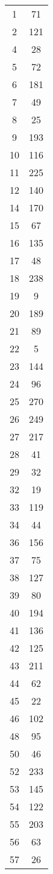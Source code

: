 \documentclass[10pt,letterpaper]{article}\usepackage[]{graphicx}\usepackage[]{color}
\begin{document}
\begin{center}
\begin{longtable}[c]{cc}
		1  & 71 \\
		2  & 121 \\
		4  & 28 \\
		5  & 72 \\
		6  & 181 \\
		7  & 49 \\
		8  & 25 \\
		9  & 193 \\
		10 & 116 \\
		11 & 225 \\
		12 & 140 \\
		14 & 170 \\
		15 & 67 \\
		16 & 135 \\
		17 & 48 \\
		18 & 238 \\
		19 & 9 \\
		20 & 189 \\
		21 & 89 \\
		22 & 5 \\
		23 & 144 \\
		24 & 96 \\
		25 & 270 \\
		26 & 249 \\
		27 & 217 \\
		28 & 41 \\
		29 & 32 \\
		32 & 19 \\
		33 & 119 \\
		34 & 44 \\
		36 & 156 \\
		37 & 75 \\
		38 & 127 \\
		39 & 80 \\
		40 & 194 \\
		41 & 136 \\
		42 & 125 \\
		43 & 211 \\
		44 & 62 \\
		45 & 22 \\
		46 & 102 \\
		48 & 95 \\
		50 & 46 \\
		52 & 233 \\
		53 & 145 \\
		54 & 122 \\
		55 & 203 \\
		56 & 63 \\
		57 & 26 \\

\end{longtable}
\end{center}
\end{document}
